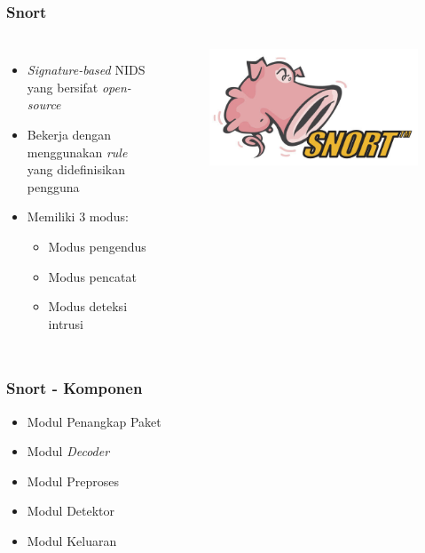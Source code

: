 \documentclass{beamer}
\begin{document}

  \begin{frame}
  \frametitle{Snort}
  \begin{columns}[c]
    \begin{itemize}
      \item \emph{Signature-based} NIDS yang bersifat \emph{open-source}
      \item Bekerja dengan menggunakan \emph{rule} yang didefinisikan pengguna
      \item Memiliki 3 modus:
      \begin{itemize}
        \item Modus pengendus
        \item Modus pencatat
        \item Modus deteksi intrusi
      \end{itemize}
    \end{itemize}

    \begin{figure}
      \includegraphics[width=0.8\linewidth]{resources/snort.jpg}
    \end{figure}
  \end{columns}
  \end{frame}


  \begin{frame}
  \frametitle{Snort - Komponen}
  \begin{itemize}
    \item Modul Penangkap Paket
    \item Modul \emph{Decoder}
    \item Modul Preproses
    \item Modul Detektor
    \item Modul Keluaran
  \end{itemize}
  \end{frame}
\end{document}
